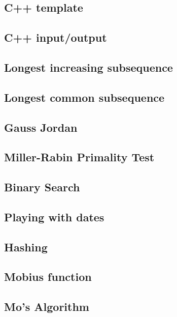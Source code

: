 \subsection{C++ template}
\raggedbottom
\hrulefill
\subsection{C++ input/output}
\raggedbottom
\hrulefill
\subsection{Longest increasing subsequence}
\raggedbottom
\hrulefill
\subsection{Longest common subsequence}
\raggedbottom
\hrulefill
\subsection{Gauss Jordan}
\raggedbottom
\hrulefill
\subsection{Miller-Rabin Primality Test}
\raggedbottom
\hrulefill
\subsection{Binary Search}
\raggedbottom
\hrulefill
\subsection{Playing with dates}
\raggedbottom
\hrulefill
\subsection{Hashing}
\raggedbottom
\hrulefill
\subsection{Mobius function}
\raggedbottom
\hrulefill
\subsection{Mo's Algorithm}
\raggedbottom
\hrulefill

